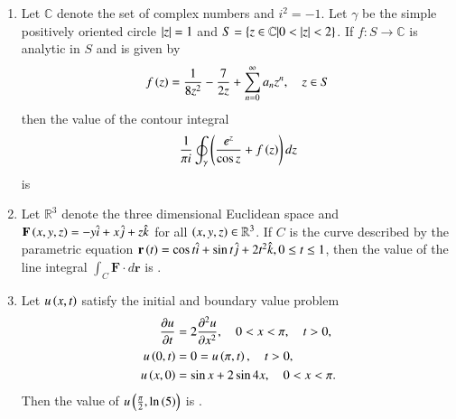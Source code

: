 \documentclass[a4paper,10pt]{article}
\begin{document}
\begin{enumerate}
    \item Let $\mathbb{C}$ denote the set of complex numbers and $i^2 = -1$. Let $\gamma$ be the simple positively oriented circle $\left\vert z\right\vert=1$ and $S = \{z \in \mathbb{C} | 0 < \left\vert z\right\vert < 2\}$. If $f: S \to \mathbb{C}$ is analytic in $S$ and is given by
    \begin{align*}
        f\left(z\right) = \frac{1}{8z^2} - \frac{7}{2z} + \sum_{n=0}^{\infty} a_n z^n, \quad z \in S
    \end{align*}
    then the value of the contour integral $$\frac{1}{\pi i} \oint_\gamma \left(\frac{e^z}{\cos z} + f\left(z\right)\right) dz$$ is
    \hfill{}
    \begin{enumerate}[label=\Alph*)]
    \end{enumerate}

    \item Let $\mathbb{R}^3$ denote the three dimensional Euclidean space and $\mathbf{F}\left(x, y, z\right) = -y\hat{i} + x\hat{j} + z\hat{k}$ for all $\left(x, y, z\right) \in \mathbb{R}^3$. If $C$ is the curve described by the parametric equation $\mathbf{r}\left(t\right) = \cos t \hat{i} + \sin t \hat{j} + 2t^2\hat{k}, 0 \le t \le 1$, then the value of the line integral $\int_C \mathbf{F} \cdot d\mathbf{r}$ is \underline{\hspace{2cm}}.
    \hfill{}

    \item Let $u\left(x, t\right)$ satisfy the initial and boundary value problem
    \begin{align*}
        \frac{\partial u}{\partial t} &= 2 \frac{\partial^2 u}{\partial x^2}, \quad 0 < x < \pi, \quad t > 0, \\
        u\left(0, t\right) &= 0 = u\left(\pi, t\right), \quad t > 0, \\
        u\left(x, 0\right) &= \sin x + 2\sin 4x, \quad 0 < x < \pi.
    \end{align*}
    Then the value of $u\left(\frac{\pi}{2}, \ln\left(5\right)\right)$ is \underline{\hspace{2cm}}.
    \hfill{}
\end{enumerate}
\clearpage
\end{document}
